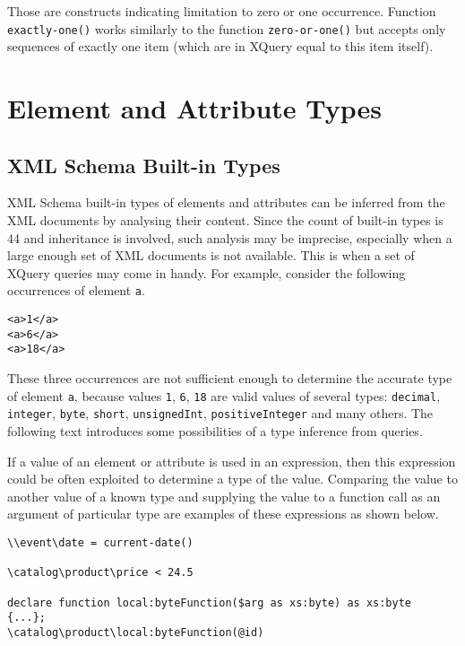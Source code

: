 Those are constructs indicating limitation to zero or one occurrence. Function \texttt{exactly-one()} works similarly to the function \texttt{zero-or-one()} but accepts only sequences of exactly one item (which are in XQuery equal to this item itself).

\section{Element and Attribute Types}

\subsection{XML Schema Built-in Types}
XML Schema built-in types of elements and attributes can be inferred from the XML documents by analysing their content. Since the count of built-in types is 44 and inheritance is involved, such analysis may be imprecise, especially when a large enough set of XML documents is not available. This is when a set of XQuery queries may come in handy. For example, consider the following occurrences of element \texttt{a}.

\begin{verbatim}
<a>1</a>
<a>6</a>
<a>18</a>
\end{verbatim}

These three occurrences are not sufficient enough to determine the accurate type of element \texttt{a}, because values \texttt{1}, \texttt{6}, \texttt{18} are valid values of several types: \texttt{decimal}, \texttt{integer}, \texttt{byte}, \texttt{short}, \texttt{unsignedInt}, \texttt{positiveInteger} and many others. The following text introduces some possibilities of a type inference from queries.

If a value of an element or attribute is used in an expression, then this expression could be often exploited to determine a type of the value. Comparing the value to another value of a known type and supplying the value to a function call as an argument of particular type are examples of these expressions as shown below.

\begin{verbatim}
\\event\date = current-date()

\catalog\product\price < 24.5

declare function local:byteFunction($arg as xs:byte) as xs:byte
{...};
\catalog\product\local:byteFunction(@id)
\end{verbatim}


